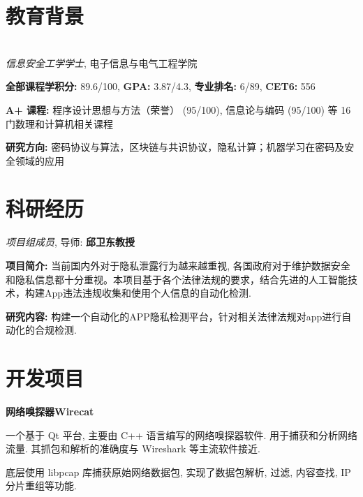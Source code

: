\documentclass{cv_cn}
\begin{document}
\section{教育背景}
  \\
\textit{信息安全工学学士}, 电子信息与电气工程学院 \\

\begin{zitemize}
  \item \textbf{全部课程学积分:} 89.6/100, 
        \textbf{GPA:} 3.87/4.3, 
        \textbf{专业排名:} 6/89, 
        \textbf{CET6:} 556
  \item \textbf{A+ 课程:} 
        程序设计思想与方法（荣誉） (95/100),
        信息论与编码 (95/100) 
        等 16 门数理和计算机相关课程
  \item \textbf{研究方向:} 
        密码协议与算法，区块链与共识协议，隐私计算；机器学习在密码及安全领域的应用
\end{zitemize}

\section{科研经历}
\textit{项目组成员}, 导师: \textbf{邱卫东教授} 
\begin{zitemize}
  \item \textbf{项目简介:} 当前国内外对于隐私泄露行为越来越重视, 各国政府对于维护数据安全和隐私信息都十分重视。本项目基于各个法律法规的要求，结合先进的人工智能技术，构建App违法违规收集和使用个人信息的自动化检测.
  \item \textbf{研究内容:} 构建一个自动化的APP隐私检测平台，针对相关法律法规对app进行自动化的合规检测.
\end{zitemize}



\section{开发项目}
\textbf{网络嗅探器Wirecat}\enskip \underline{\href{https://github.com/ysyszheng/wirecat}{\faGithub}}
\begin{zitemize}
  \item 一个基于 Qt 平台, 主要由 C++ 语言编写的网络嗅探器软件. 用于捕获和分析网络流量. 其抓包和解析的准确度与 Wireshark 等主流软件接近.
  \item 底层使用 libpcap 库捕获原始网络数据包, 实现了数据包解析, 过滤, 内容查找, IP 分片重组等功能.
\end{zitemize}
\end{document}
